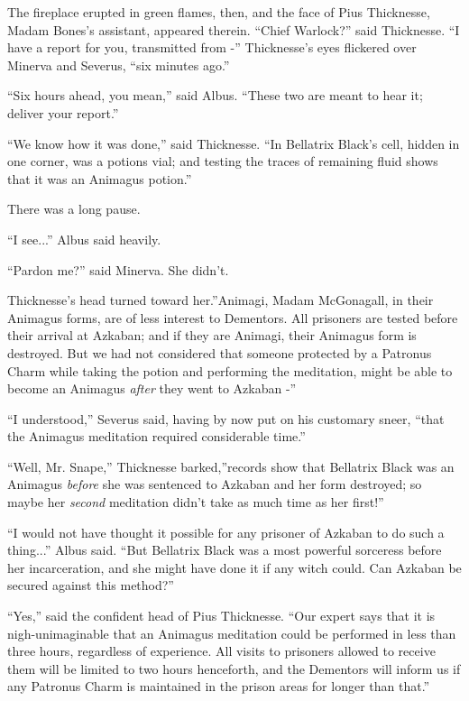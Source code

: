 The fireplace erupted in green flames, then, and the face of Pius
Thicknesse, Madam Bones's assistant, appeared therein. ``Chief
Warlock?'' said Thicknesse. ``I have a report for you, transmitted from
-'' Thicknesse's eyes flickered over Minerva and Severus, ``six minutes
ago.''

``Six hours ahead, you mean,'' said Albus. ``These two are meant to hear
it; deliver your report.''

``We know how it was done,'' said Thicknesse. ``In Bellatrix Black's
cell, hidden in one corner, was a potions vial; and testing the traces
of remaining fluid shows that it was an Animagus potion.''

There was a long pause.

``I see...'' Albus said heavily.

``Pardon me?'' said Minerva. She didn't.

Thicknesse's head turned toward her.''Animagi, Madam McGonagall, in
their Animagus forms, are of less interest to Dementors. All prisoners
are tested before their arrival at Azkaban; and if they are Animagi,
their Animagus form is destroyed. But we had not considered that someone
protected by a Patronus Charm while taking the potion and performing the
meditation, might be able to become an Animagus \emph{after} they went
to Azkaban -''

``I understood,'' Severus said, having by now put on his customary
sneer, ``that the Animagus meditation required considerable time.''

``Well, Mr. Snape,'' Thicknesse barked,''records show that Bellatrix
Black was an Animagus \emph{before} she was sentenced to Azkaban and her
form destroyed; so maybe her \emph{second} meditation didn't take as
much time as her first!''

``I would not have thought it possible for any prisoner of Azkaban to do
such a thing...'' Albus said. ``But Bellatrix Black was a most
powerful sorceress before her incarceration, and she might have done it
if any witch could. Can Azkaban be secured against this method?''

``Yes,'' said the confident head of Pius Thicknesse. ``Our expert says
that it is nigh-unimaginable that an Animagus meditation could be
performed in less than three hours, regardless of experience. All visits
to prisoners allowed to receive them will be limited to two hours
henceforth, and the Dementors will inform us if any Patronus Charm is
maintained in the prison areas for longer than that.''

